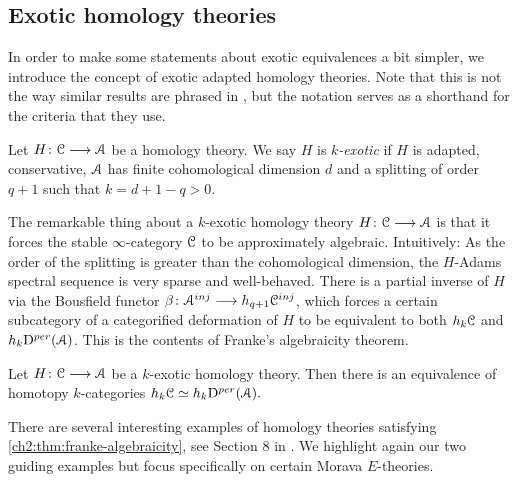 



\subsection{Exotic homology theories}


In order to make some statements about exotic equivalences a bit simpler, we introduce the concept of exotic adapted homology theories. Note that this is not the way similar results are phrased in \cite{patchkoria-pstragowski_2021}, but the notation serves as a shorthand for the criteria that they use. 

\begin{definition}
    \label{ch2:def:k-exotic-homology-theory}
     Let $H\colon \EuScript{C}\longrightarrow \EuScript{A}$ be a homology theory. We say $H$ is \emph{$k$-exotic} if $H$ is adapted, conservative, $\EuScript{A}$ has finite cohomological dimension $d$ and a splitting of order $q+1$ such that $k=d+1-q>0$. 
\end{definition}
    
The remarkable thing about a $k$-exotic homology theory $H\colon \EuScript{C}\longrightarrow \EuScript{A}$ is that it forces the stable $\infty$-category $\EuScript{C}$ to be approximately algebraic. Intuitively: As the order of the splitting is greater than the cohomological dimension, the $H$-Adams spectral sequence is very sparse and well-behaved. There is a partial inverse of $H$ via the Bousfield functor $\beta\colon \EuScript{A}^{inj}\longrightarrow h_{q+1} \EuScript{C}^{inj}$, which forces a certain subcategory of a categorified deformation of $H$ to be equivalent to both $h_k \EuScript{C}$ and $h_k \mathrm{D}^{per}(\EuScript{A})$. This is the contents of Franke's algebraicity theorem. 
    
\begin{theorem}
    \label{ch2:thm:franke-algebraicity}
    Let $H\colon \EuScript{C}\longrightarrow \EuScript{A}$ be a $k$-exotic homology theory. Then there is an equivalence of homotopy $k$-categories $h_k \EuScript{C} \simeq h_k \mathrm{D}^{per}(\EuScript{A}).$
\end{theorem}
    
There are several interesting examples of homology theories satisfying \cref{ch2:thm:franke-algebraicity}, see Section 8 in \cite{patchkoria-pstragowski_2021}. We highlight again our two guiding examples but focus specifically on certain Morava $E$-theories. 

